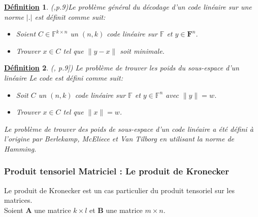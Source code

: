 \documentclass[12pt,openany]{report}
\newtheorem{definition}{\underline{Définition}}
\begin{document}
\begin{definition} (\cite{overbeck2020},p.9)Le problème général du décodage d'un code linéaire sur une norme $ \lvert . \rvert$ est définit comme suit:\\
\begin{itemize}
\item Soient $\mathit{C} \in \mathbb{F}^{k\times n}$ un $(n,k)$ code linéaire  sur $\mathbb{F}$ et $ y \in \mathbf{F}^{n} $.  
\item Trouver $ x \in \mathit{C} $ tel que $\lVert y-x \rVert$ soit minimale.
\end{itemize} 
\end{definition}

\begin{definition}(\cite{overbeck2020}, p.9])
Le problème de trouver les poids du sous-espace d’un linéaire
Le code est défini comme suit:
\begin{itemize}
\item Soit $ \mathit{C}$  un $(n,k)$ code linéaire sur $\mathbb{F}$ et $ y \in \mathbb{F}^n$ avec $ \lVert y \rVert = w$.
\item Trouver $ x \in \mathit{C}$ tel que $ \lVert x \rVert = w$.  

\end{itemize}

Le problème de trouver des poids de sous-espace d’un code linéaire a été défini à l’origine
par Berlekamp, McEliece et Van Tilborg \cite{berlekamp1978} en utilisant la norme de Hamming.
\end{definition}



\subsubsection{Produit tensoriel Matriciel : Le produit de Kronecker}

Le produit de Kronecker est un cas particulier du produit tensoriel sur les matrices.\\
Soient \textbf{A} une matrice $k \times l$ et 
\textbf{B} une matrice $ m \times n$.\\
\end{document}
